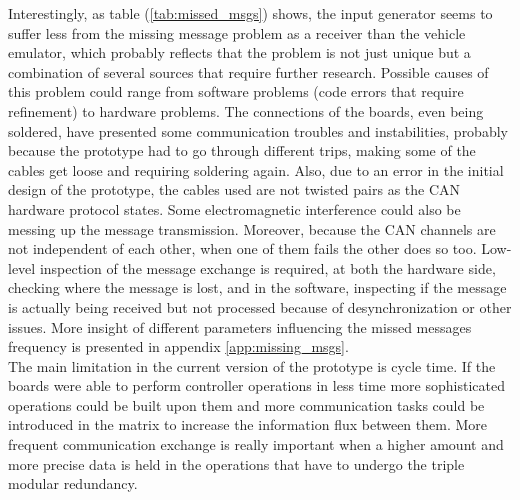 \documentclass[table,xcdraw]{article}
\begin{document}
Interestingly, as table (\ref{tab:missed_msgs}) shows, the input generator seems to suffer less from the missing message problem as a receiver than the vehicle emulator, which probably reflects that the problem is not just unique but a combination of several sources that require further research. Possible causes of this problem could range from software problems (code errors that require refinement) to hardware problems. The connections of the boards, even being soldered, have presented some communication troubles and instabilities, probably because the prototype had to go through different trips, making some of the cables get loose and requiring soldering again. Also, due to an error in the initial design of the prototype, the cables used are not twisted pairs as the CAN hardware protocol states. Some electromagnetic interference could also be messing up the message transmission. Moreover, because the CAN channels are not independent of each other, when one of them fails the other does so too. Low-level inspection of the message exchange is required, at both the hardware side, checking where the message is lost, and in the software, inspecting if the message is actually being received but not processed because of desynchronization or other issues. More insight of different parameters influencing the missed messages frequency is presented in appendix \ref{app:missing_msgs}.\\

The main limitation in the current version of the prototype is cycle time. If the boards were able to perform controller operations in less time more sophisticated operations could be built upon them and more communication tasks could be introduced in the matrix to increase the information flux between them. More frequent communication exchange is really important when a higher amount and more precise data is held in the operations that have to undergo the triple modular redundancy.\\
\end{document}
